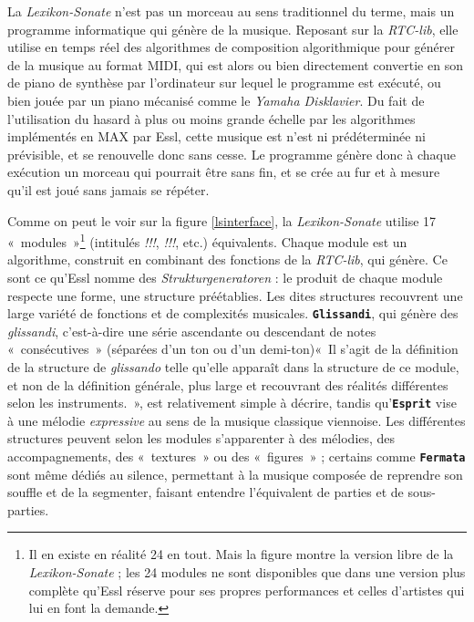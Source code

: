 \documentclass[a4paper,12pt]{article}
\newcommand{\guill}[1]{«~#1~»}
\begin{document}
La \emph{Lexikon-Sonate} n'est pas un morceau au sens traditionnel du terme, mais un programme informatique qui génère de la musique. Reposant sur la \emph{RTC-lib}, elle utilise en temps réel des algorithmes de composition algorithmique pour générer de la musique au format MIDI, qui est alors ou bien directement convertie en son de piano de synthèse par l'ordinateur sur lequel le programme est exécuté, ou bien jouée par un piano mécanisé comme le \emph{Yamaha Disklavier}. Du fait de l'utilisation du hasard à plus ou moins grande échelle par les algorithmes implémentés en MAX par Essl, cette musique est n'est ni prédéterminée ni prévisible, et se renouvelle donc sans cesse. Le programme génère donc à chaque exécution un morceau qui pourrait être sans fin, et se crée au fur et à mesure qu'il est joué sans jamais se répéter.

Comme on peut le voir sur la figure \ref{lsinterface}, la \emph{Lexikon-Sonate} utilise 17 \guill{modules}\footnote{Il en existe en réalité 24 en tout. Mais la figure montre la version libre de la \emph{Lexikon-Sonate} ; les 24 modules ne sont disponibles que dans une version plus complète qu'Essl réserve pour ses propres performances et celles d'artistes qui lui en font la demande.} (intitulés \emph{!!!}, \emph{!!!}, etc.) équivalents. Chaque module est un algorithme, construit en combinant des fonctions de la \emph{RTC-lib}, qui génère. Ce sont ce qu'Essl nomme des \emph{Strukturgeneratoren} : le produit de chaque module respecte une forme, une structure préétablies. Les dites structures recouvrent une large variété de fonctions et de complexités musicales. \texttt{\textbf{Glissandi}}, qui génère des \emph{glissandi}, c'est-à-dire une série ascendante ou descendant de notes \guill{consécutives} (séparées d'un ton ou d'un demi-ton)\guill{Il s'agit de la définition de la structure de \emph{glissando} telle qu'elle apparaît dans la structure de ce module, et non de la définition générale, plus large et recouvrant des réalités différentes selon les instruments.}, est relativement simple à décrire, tandis qu'\texttt{\textbf{Esprit}} vise à une mélodie \emph{expressive} au sens de la musique classique viennoise. Les différentes structures peuvent selon les modules s'apparenter à des mélodies, des accompagnements, des \guill{textures} ou des \guill{figures} ; certains comme \texttt{\textbf{Fermata}} sont même dédiés au silence, permettant à la musique composée de reprendre son souffle et de la segmenter, faisant entendre l'équivalent de parties et de sous-parties.
\end{document}
